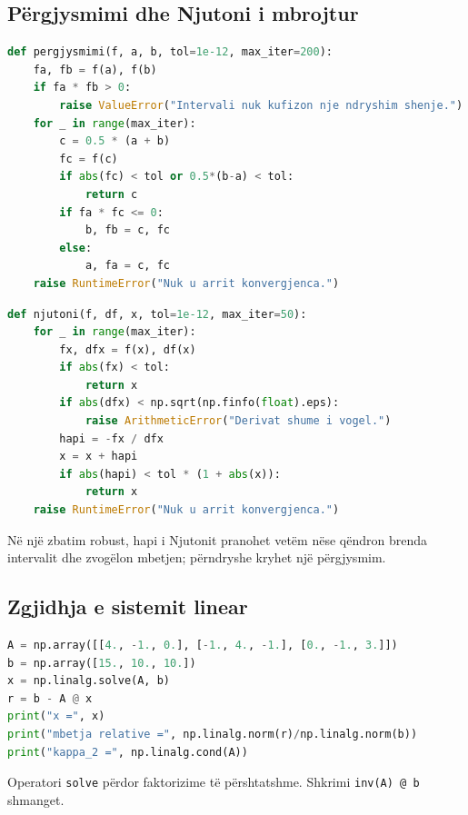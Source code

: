 \documentclass[11pt,oneside,openany]{book}
\begin{document}
\subsection{Përgjysmimi dhe Njutoni i mbrojtur}
\begin{lstlisting}[language=Python,caption={Përgjysmimi me kontroll të intervalit.}]
def pergjysmimi(f, a, b, tol=1e-12, max_iter=200):
    fa, fb = f(a), f(b)
    if fa * fb > 0:
        raise ValueError("Intervali nuk kufizon nje ndryshim shenje.")
    for _ in range(max_iter):
        c = 0.5 * (a + b)
        fc = f(c)
        if abs(fc) < tol or 0.5*(b-a) < tol:
            return c
        if fa * fc <= 0:
            b, fb = c, fc
        else:
            a, fa = c, fc
    raise RuntimeError("Nuk u arrit konvergjenca.")
\end{lstlisting}

\begin{lstlisting}[language=Python,caption={Njutoni me kontroll të derivatit.}]
def njutoni(f, df, x, tol=1e-12, max_iter=50):
    for _ in range(max_iter):
        fx, dfx = f(x), df(x)
        if abs(fx) < tol:
            return x
        if abs(dfx) < np.sqrt(np.finfo(float).eps):
            raise ArithmeticError("Derivat shume i vogel.")
        hapi = -fx / dfx
        x = x + hapi
        if abs(hapi) < tol * (1 + abs(x)):
            return x
    raise RuntimeError("Nuk u arrit konvergjenca.")
\end{lstlisting}
Në një zbatim robust, hapi i Njutonit pranohet vetëm nëse qëndron brenda intervalit dhe zvogëlon mbetjen; përndryshe kryhet një përgjysmim.

\subsection{Zgjidhja e sistemit linear}
\begin{lstlisting}[language=Python,caption={Zgjidhja dhe diagnostika pa formuar inversin.}]
A = np.array([[4., -1., 0.], [-1., 4., -1.], [0., -1., 3.]])
b = np.array([15., 10., 10.])
x = np.linalg.solve(A, b)
r = b - A @ x
print("x =", x)
print("mbetja relative =", np.linalg.norm(r)/np.linalg.norm(b))
print("kappa_2 =", np.linalg.cond(A))
\end{lstlisting}
Operatori \texttt{solve} përdor faktorizime të përshtatshme. Shkrimi \texttt{inv(A) @ b} shmanget.
\end{document}
